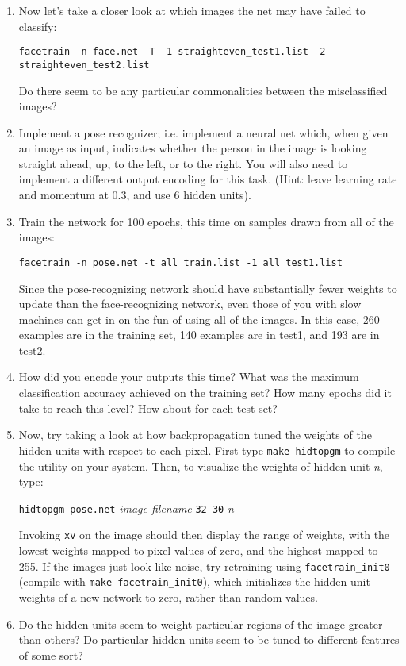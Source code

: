 \begin{enumerate}
\item Now let's take a closer look at which images the net may have failed
to classify:

{\tt facetrain -n face.net -T -1 straighteven\_test1.list -2 straighteven\_test2.list}

Do there seem to be any particular commonalities between the misclassified
images?

\item Implement a pose recognizer; i.e. implement a neural net which,
when given an image as input, indicates whether the person in the image
is looking straight ahead, up, to the left, or to the right.  You
will also need to implement a different output encoding for this task.
(Hint: leave learning rate and momentum at
0.3, and use 6 hidden units).

\item Train the network for 100 epochs, this time on samples drawn
from all of the images:

{\tt facetrain -n pose.net -t all\_train.list -1 all\_test1.list}

Since the pose-recognizing network should have substantially fewer weights to
update than the face-recognizing network, even those of you with slow machines
can get in on the fun of using all of the images.  In this case, 260 examples
are in the training set, 140 examples are in test1, and 193 are in test2.

\item How did you encode your outputs this time?
What was the maximum classification accuracy achieved on the training set?
How many epochs did it take to reach this level?  How about for each test set?

\item Now, try taking a look at how backpropagation tuned the weights
of the hidden units with respect to each pixel.  First type {\tt make
hidtopgm} to compile the utility on your system.  Then, to visualize the
weights of hidden unit {\it n}, type:

{\tt hidtopgm pose.net} {\it image-filename} {\tt 32 30} {\it n}

Invoking {\tt xv} on the image should then display the range of weights,
with the lowest weights mapped to pixel values of zero, and the highest
mapped to 255.  If the images just look like noise, try retraining using
{\tt facetrain\_init0} (compile with {\tt make facetrain\_init0}), which
initializes the hidden unit weights of a new network to zero, rather
than random values.

\item Do the hidden units seem to weight particular regions of the image
greater than others?  Do particular hidden units seem to be tuned
to different features of some sort?

\end{enumerate}

